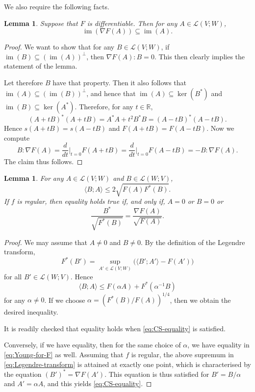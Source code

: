 \documentclass[a4paper]{article}
\newcommand{\R}{\mathbb{R}}
\newcommand{\Lin}{\mathcal{L}}
\DeclareMathOperator{\im}{im}
\newcommand{\pairing}[2]{\langle #1; #2 \rangle}
\newtheorem{lemma}[theorem]{Lemma}
\theoremstyle{definition}
\theoremstyle{remark}
\begin{document}
We also require the following facts.

\begin{lemma} \label{lem:images}
Suppose that $F$ is differentiable. Then for any $A \in \Lin(V; W)$,
\[
\im(\nabla F(A)) \subseteq \im(A).
\]
\end{lemma}

\begin{proof}
We want to show that for any $B \in \Lin(V; W)$, if
$\im(B) \subseteq (\im(A))^\perp$, then $\nabla F(A) : B = 0$.
This then clearly implies the statement of the lemma.

Let therefore $B$ have that property. Then it also follows that
$\im(A) \subseteq (\im(B))^\perp$, and hence
that $\im(A) \subseteq \ker(B^*)$ and $\im(B) \subseteq \ker(A^*)$.
Therefore, for any $t \in \R$,
\[
(A + tB)^* (A + tB) = A^* A + t^2 B^* B = (A - tB)^* (A - tB).
\]
Hence $s(A + tB) = s(A - tB)$ and $F(A + tB) = F(A - tB)$. Now we compute
\[
B : \nabla F(A) = \frac{d}{dt}\Bigr|_{t = 0} F(A + tB) = \frac{d}{dt}\Bigr|_{t = 0} F(A - tB) = - B : \nabla F(A).
\]
The claim thus follows.
\end{proof}

\begin{lemma} \label{lem:Cauchy-Schwarz-generalisation}
For any $A \in \Lin(V; W)$ and $B \in \Lin(W; V)$,
\[
\pairing{B}{A} \le 2\sqrt{F(A) F^*(B)}.
\]
If $f$ is regular, then equality holds true if, and only if, $A = 0$ or $B = 0$ or
\begin{equation} \label{eq:CS-equality}
\frac{B^*}{\sqrt{F^*(B)}} = \frac{\nabla F(A)}{\sqrt{F(A)}}.
\end{equation}
\end{lemma}

\begin{proof}
We may assume that $A \neq 0$ and $B \neq 0$. By the definition of the Legendre transform,
\begin{equation} \label{eq:Legendre-transform}
F^*(B') = \sup_{A' \in \Lin(V; W)} \bigl(\pairing{B'}{A'} - F(A')\bigr)
\end{equation}
for all $B' \in \Lin(W; V)$. Hence
\begin{equation} \label{eq:Young-for-F}
\pairing{B}{A} \le F(\alpha A) + F^*(\alpha^{-1} B)
\end{equation}
for any $\alpha \neq 0$. If we choose $\alpha = (F^*(B)/F(A))^{1/4}$, then we obtain the desired inequality.

It is readily checked that equality holds when \eqref{eq:CS-equality} is satisfied.

Conversely, if we have equality, then for the same choice of $\alpha$, we have equality in \eqref{eq:Young-for-F} as well.
Assuming that $f$ is regular, the above supremum in \eqref{eq:Legendre-transform} is attained at exactly one point, which is characterised by
the equation $(B')^* = \nabla F(A')$. This equation is thus satisfied for $B' = B/\alpha$ and $A' = \alpha A$,
and this yields \eqref{eq:CS-equality}.
\end{proof}
\end{document}
